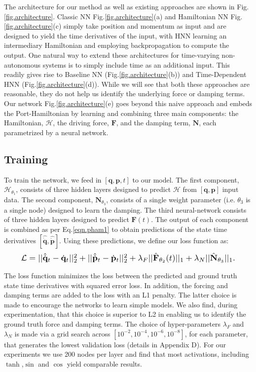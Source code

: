 \documentclass{article}
\begin{document}
The architecture for our method as well as existing approaches are shown in Fig.\ref{fig.architecture}. Classic NN Fig.\ref{fig.architecture}(a) and Hamiltonian NN Fig.\ref{fig.architecture}(c) \cite{greydanus_hamiltonian_2019} simply take position and momentum as input and are designed to yield the time derivatives of the input, with HNN learning an intermediary Hamiltonian and employing backpropagation to compute the output. One natural way to extend these architectures for time-varying non-autonomous systems is to simply include time as an additional input. This readily gives rise to Baseline NN (Fig.\ref{fig.architecture}(b)) and Time-Dependent HNN (Fig.\ref{fig.architecture}(d)). While we will see that both these approaches are reasonable, they do not help us identify the underlying force or damping terms. Our network Fig.\ref{fig.architecture}(e) goes beyond this naive approach and embeds the Port-Hamiltonian by learning and combining three main components: the Hamiltonian, $\mathcal{H}$, the driving force, $\mathbf{F}$, and the damping term, $\mathbf{N}$, each parametrized by a neural network. 

\subsection{Training}
To train the network, we feed in $ [\mathbf{q},\mathbf{p},t]$ to our model. The first component, $\mathcal{H}_{\theta_1}$, consists of three hidden layers designed to predict $\mathcal{H}$ from $[\mathbf{q},\mathbf{p}]$ input data. The second component, $\mathbf{N}_{\theta_3}$, consists of a single weight parameter (i.e. $\theta_3$ is a single node) designed to learn the damping. The third neural-network consists of three hidden layers designed to predict $\mathbf{F}(t)$. The output of each component is combined as per Eq.\ref{eqn.pham1} to obtain predictions of the state time derivatives $[\hat{\dot{\mathbf{q}}},\hat{\dot{\mathbf{p}}}]$. Using these predictions, we define our loss function as:
\begin{equation}
\label{eqn.loss}
\resizebox{0.9\columnwidth}{!}{%
  $\mathcal{L} =|| \hat{\dot{\mathbf{q}}}_t - \dot{\mathbf{q}}_t ||_2^2 +
|| \hat{\dot{\mathbf{p}}}_t -\dot{\mathbf{p}}_t ||_2^2 + \lambda_F|| \hat{\mathbf{F}}_{\theta_2} (t)||_1 + \lambda_N||\hat{\mathbf{N}}_{\theta_3}||_1$.%
}
\end{equation}

The loss function minimizes the loss between the predicted and ground truth state time derivatives with squared error loss. In addition, the forcing and damping terms are added to the loss with an L1 penalty. The latter choice is made to encourage the networks to learn simple models. We also find, during experimentation, that this choice is superior to L2 in enabling us to identify the ground truth force and damping terms. The choice of hyper-parameters $\lambda_F$ and $\lambda_{N}$ is made via a grid search across $[10^{-2},10^{-4},10^{-6},10^{-8}]$, for each parameter, that generates the lowest validation loss (details in Appendix D). For our experiments we use 200 nodes per layer and find that most activations, including $\tanh$,$\sin$ and $\cos$ yield comparable results. 
\end{document}
